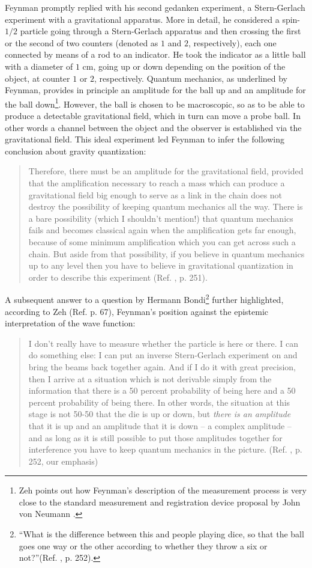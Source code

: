 \documentclass{ws-procs961x669}            %
\begin{document}
Feynman promptly replied with his second gedanken experiment, a
Stern-Gerlach experiment with a gravitational apparatus. More in
detail, he considered a spin-$1/2$ particle going through a
Stern-Gerlach apparatus and then crossing the first or the second
of two counters (denoted as $1$ and $2$, respectively), each one
connected by means of a rod to an indicator. He took the indicator
as a little ball with a diameter of $1$ cm, going up or down
depending on the position of the object, at counter $1$ or $2$,
respectively. Quantum mechanics, as underlined by Feynman,
provides in principle an amplitude for the ball up and an
amplitude for the ball down\footnote{Zeh \cite{Zeh} points out how
Feynman's description of the measurement process is very close to
the standard measurement and registration device proposal by John
von Neumann \cite{VonN}.}. However, the ball is chosen to be
macroscopic, so as to be able to produce a detectable
gravitational field, which in turn can move a probe ball. In other
words a channel between the object and the observer is established
via the gravitational field. This ideal experiment led Feynman to
infer the following conclusion about gravity quantization:
%
\begin{quote}
Therefore, there must be an amplitude for the gravitational field,
provided that the amplification necessary to reach a mass which
can produce a gravitational field big enough to serve as a link in
the chain does not destroy the possibility of keeping quantum
mechanics all the way. There is a bare possibility (which I
shouldn't mention!) that quantum mechanics fails and becomes
classical again when the amplification gets far enough, because of
some minimum amplification which you can get across such a chain.
But aside from that possibility, if you believe in quantum
mechanics up to any level then you have to believe in
gravitational quantization in order to describe this experiment
(Ref. , p. 251).
\end{quote}
%
A subsequent answer to a question by Hermann Bondi\footnote{``What
is the difference between this and people playing dice, so that
the ball goes one way or the other according to whether they throw
a six or not?''(Ref. , p. 252).} further highlighted,
according to Zeh (Ref.  p. 67), Feynman's position
against the epistemic interpretation of the wave function:
%
\begin{quote}
I don't really have to measure whether the particle is here or
there. I can do something else: I can put an inverse Stern-Gerlach
experiment on and bring the beams back together again. And if I do
it with great precision, then I arrive at a situation which is not
derivable simply from the information that there is a 50 percent
probability of being here and a 50 percent probability of being
there. In other words, the situation at this stage is not 50-50
that the die is up or down, but \emph{there is an amplitude} that
it is up and an amplitude that it is down -- a complex amplitude
-- and as long as it is still possible to put those amplitudes
together for interference you have to keep quantum mechanics in
the picture. (Ref. , p. 252, our emphasis)
\end{quote}
%
\end{document}
